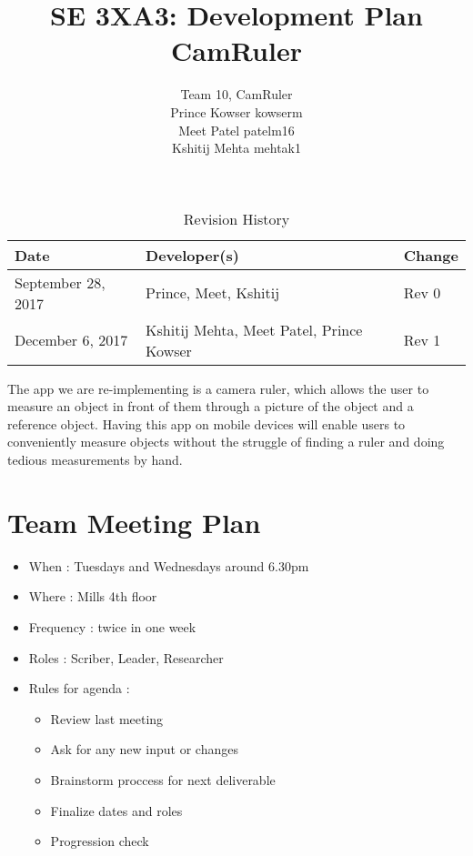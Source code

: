 \documentclass{article}
\title{SE 3XA3: Development Plan\\CamRuler}
\author{Team 10, CamRuler
		\\ Prince Kowser kowserm
		\\ Meet Patel patelm16
		\\ Kshitij Mehta mehtak1
}
\date{}
\begin{document}
\begin{table}[hp]
\caption{Revision History} \label{TblRevisionHistory}
\begin{tabularx}{\textwidth}{llX}
\toprule
\textbf{Date} & \textbf{Developer(s)} & \textbf{Change}\\
\midrule
September 28, 2017 & Prince, Meet, Kshitij & Rev 0\\
\midrule
December 6, 2017 & Kshitij Mehta, Meet Patel, Prince Kowser & Rev 1\\
\bottomrule
\end{tabularx}
\end{table}

\newpage

\maketitle

The app we are re-implementing is a camera ruler, which allows the user to measure an object in front of them through a picture of the object and a reference object. Having this app on mobile devices will enable users to conveniently measure objects without the struggle of finding a ruler and doing tedious measurements by hand. 

\section{Team Meeting Plan}
\begin{itemize}
\item When : Tuesdays and Wednesdays around 6.30pm
\item Where : Mills 4th floor
\item Frequency : twice in one week
\item Roles : Scriber, Leader, Researcher 
\item Rules for agenda : 

\begin{itemize}
 \item Review last meeting 
 \item Ask for any new input or changes
 \item Brainstorm proccess for next deliverable
 \item Finalize dates and roles
 \item Progression check
\end{itemize}

\end{itemize}

  
\end{document}
